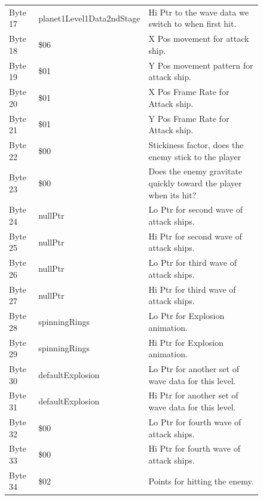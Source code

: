 \begin{figure}[H]
{\begin{adjustbox}{width=13cm}
\begin{tabular}{lll}
 Byte 17 & planet1Level1Data2ndStage & Hi Ptr to the wave data we switch to when first hit.               \\
 Byte 18 & \$06                       & X Pos movement for attack ship.                                    \\
 Byte 19 & \$01                       & Y Pos movement pattern for attack ship.                            \\
 Byte 20 & \$01                       & X Pos Frame Rate for Attack ship.                                  \\
 Byte 21 & \$01                       & Y Pos Frame Rate for Attack ship.                                  \\
 Byte 22 & \$00                       & Stickiness factor, does the enemy stick to the player              \\
 Byte 23 & \$00                       & Does the enemy gravitate quickly toward the player when its hit?   \\
 Byte 24 & nullPtr                   & Lo Ptr for second wave of attack ships.                               \\
 Byte 25 & nullPtr                   & Hi Ptr for second wave of attack ships.                               \\
 Byte 26 & nullPtr                   & Lo Ptr for third wave of attack ships.                               \\
 Byte 27 & nullPtr                   & Hi Ptr for third wave of attack ships.                               \\
 Byte 28 & spinningRings             & Lo Ptr for Explosion animation.                                    \\
 Byte 29 & spinningRings             & Hi Ptr for Explosion animation.                                    \\
 Byte 30 & defaultExplosion          & Lo Ptr for another set of wave data for this level.                \\
 Byte 31 & defaultExplosion          & Hi Ptr for another set of wave data for this level.                \\
 Byte 32 & \$00                       & Lo Ptr for fourth wave of attack ships.                                                            \\
 Byte 33 & \$00                       & Hi Ptr for fourth wave of attack ships.                           \\
 Byte 34 & \$02                       & Points for hitting the enemy. \\

\end{tabular}
\end{adjustbox}}
\end{figure}
